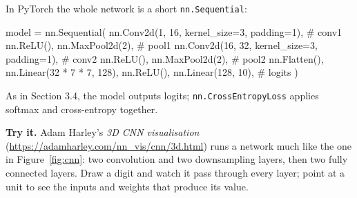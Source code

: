 \documentclass[12pt, a4paper]{article}
\begin{document}
In PyTorch the whole network is a short \texttt{nn.Sequential}:

\begin{codebox}
model = nn.Sequential(
    nn.Conv2d(1, 16, kernel_size=3, padding=1),   # conv1
    nn.ReLU(),
    nn.MaxPool2d(2),                              # pool1
    nn.Conv2d(16, 32, kernel_size=3, padding=1),  # conv2
    nn.ReLU(),
    nn.MaxPool2d(2),                              # pool2
    nn.Flatten(),
    nn.Linear(32 * 7 * 7, 128),
    nn.ReLU(),
    nn.Linear(128, 10),                           # logits
)
\end{codebox}

As in Section 3.4, the model outputs logits; \texttt{nn.CrossEntropyLoss}
applies softmax and cross-entropy together.

\begin{notebox}
  \textbf{Try it.} Adam Harley's \emph{3D CNN visualisation}
  (\url{https://adamharley.com/nn_vis/cnn/3d.html}) runs a network much like
  the one in Figure~\ref{fig:cnn}: two convolution and two downsampling layers,
  then two fully connected layers. Draw a digit and watch it pass through every
  layer; point at a unit to see the inputs and weights that produce its
  value.
\end{notebox}
\end{document}
